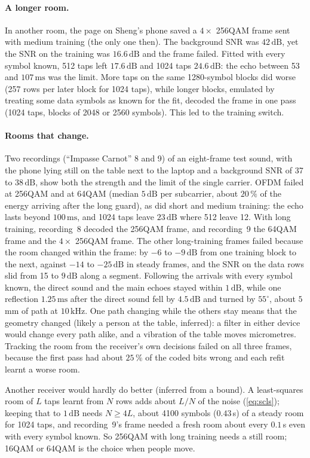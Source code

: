 \documentclass[11pt,a4paper]{article}
\newcommand{\kHz}{\,\mathrm{kHz}}
\newcommand{\ms}{\,\mathrm{ms}}
\newcommand{\dB}{\,\mathrm{dB}}
\theoremstyle{remark}
\begin{document}
\paragraph{A longer room.}
In another room, the page on Sheng's phone saved a $4\times$ 256QAM frame sent with medium training (the only one then). The background SNR was $42\dB$, yet the SNR on the training was $16.6\dB$ and the frame failed. Fitted with every symbol known, 512 taps left $17.6\dB$ and 1024 taps $24.6\dB$: the echo between 53 and $107\ms$ was the limit. More taps on the same 1280-symbol blocks did worse (257 rows per later block for 1024 taps), while longer blocks, emulated by treating some data symbols as known for the fit, decoded the frame in one pass (1024 taps, blocks of 2048 or 2560 symbols). This led to the training switch.

\paragraph{Rooms that change.}
Two recordings (``Impasse Carnot'' 8 and 9) of an eight-frame test sound, with the phone lying still on the table next to the laptop and a background SNR of 37 to $38\dB$, show both the strength and the limit of the single carrier. OFDM failed at 256QAM and at 64QAM (median $5\dB$ per subcarrier, about $20\,\%$ of the energy arriving after the long guard), as did short and medium training: the echo lasts beyond $100\ms$, and 1024 taps leave $23\dB$ where 512 leave 12. With long training, recording~8 decoded the 256QAM frame, and recording~9 the 64QAM frame and the $4\times$ 256QAM frame. The other long-training frames failed because the room changed within the frame: by $-6$ to $-9\dB$ from one training block to the next, against $-14$ to $-25\dB$ in steady frames, and the SNR on the data rows slid from 15 to $9\dB$ along a segment. Following the arrivals with every symbol known, the direct sound and the main echoes stayed within $1\dB$, while one reflection $1.25\ms$ after the direct sound fell by $4.5\dB$ and turned by $55^\circ$, about $5$\,mm of path at $10\kHz$. One path changing while the others stay means that the geometry changed (likely a person at the table, inferred): a filter in either device would change every path alike, and a vibration of the table moves micrometres. Tracking the room from the receiver's own decisions failed on all three frames, because the first pass had about $25\,\%$ of the coded bits wrong and each refit learnt a worse room.

Another receiver would hardly do better (inferred from a bound). A least-squares room of $L$ taps learnt from $N$ rows adds about $L/N$ of the noise (\cref{eq:scls}); keeping that to $1\dB$ needs $N \ge 4L$, about 4100 symbols ($0.43$\,s) of a steady room for 1024 taps, and recording~9's frame needed a fresh room about every $0.1$\,s even with every symbol known. So 256QAM with long training needs a still room; 16QAM or 64QAM is the choice when people move.
\end{document}
